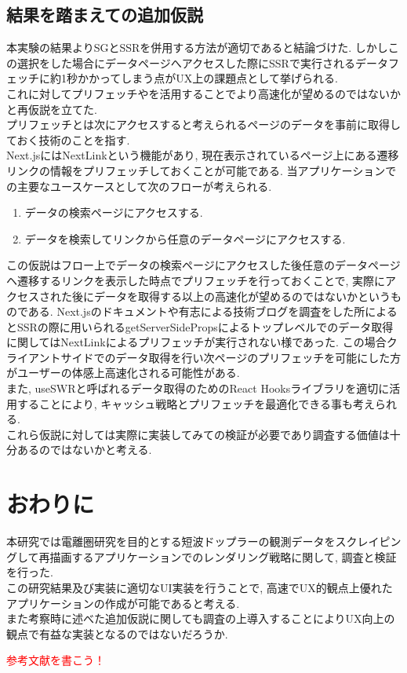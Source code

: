 \subsection{結果を踏まえての追加仮説}
本実験の結果よりSGとSSRを併用する方法が適切であると結論づけた.
しかしこの選択をした場合にデータページへアクセスした際にSSRで実行されるデータフェッチに約1秒かかってしまう点がUX上の課題点として挙げられる.\\
これに対してプリフェッチやを活用することでより高速化が望めるのではないかと再仮説を立てた.\\
プリフェッチとは次にアクセスすると考えられるページのデータを事前に取得しておく技術のことを指す.\\
Next.jsにはNextLinkという機能があり, 現在表示されているページ上にある遷移リンクの情報をプリフェッチしておくことが可能である.
当アプリケーションでの主要なユースケースとして次のフローが考えられる.\\
\begin{enumerate}
	\item データの検索ページにアクセスする.
	\item データを検索してリンクから任意のデータページにアクセスする.
\end{enumerate}
この仮説はフロー上でデータの検索ページにアクセスした後任意のデータページヘ遷移するリンクを表示した時点でプリフェッチを行っておくことで, 実際にアクセスされた後にデータを取得する以上の高速化が望めるのではないかというものである.
Next.jsのドキュメントや有志による技術ブログを調査をした所によるとSSRの際に用いられるgetServerSidePropsによるトップレベルでのデータ取得に関してはNextLinkによるプリフェッチが実行されない様であった.
この場合クライアントサイドでのデータ取得を行い次ページのプリフェッチを可能にした方がユーザーの体感上高速化される可能性がある.\\
また, useSWRと呼ばれるデータ取得のためのReact Hooksライブラリを適切に活用することにより, キャッシュ戦略とプリフェッチを最適化できる事も考えられる.\\
これら仮説に対しては実際に実装してみての検証が必要であり調査する価値は十分あるのではないかと考える.

\section{おわりに}
本研究では電離圏研究を目的とする短波ドップラーの観測データをスクレイピングして再描画するアプリケーションでのレンダリング戦略に関して, 調査と検証を行った.\\
この研究結果及び実装に適切なUI実装を行うことで, 高速でUX的観点上優れたアプリケーションの作成が可能であると考える.\\
また考察時に述べた追加仮説に関しても調査の上導入することによりUX向上の観点で有益な実装となるのではないだろうか.

\textcolor{red}{参考文献を書こう！}